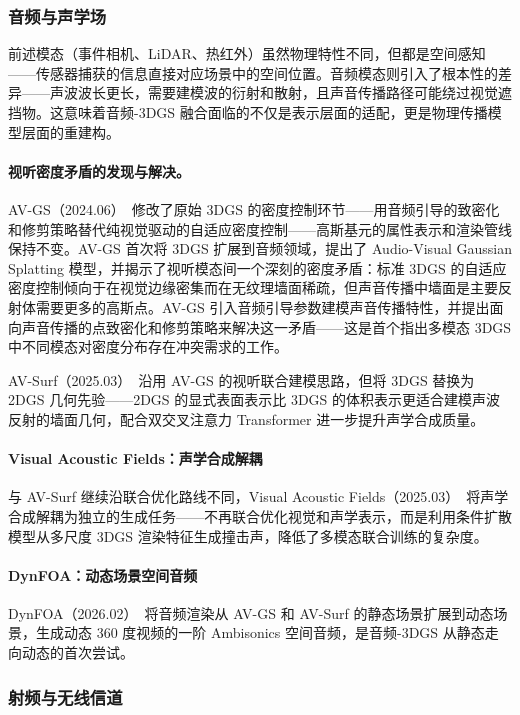 \subsubsection{音频与声学场}

前述模态（事件相机、LiDAR、热红外）虽然物理特性不同，但都是空间感知——传感器捕获的信息直接对应场景中的空间位置。音频模态则引入了根本性的差异——声波波长更长，需要建模波的衍射和散射，且声音传播路径可能绕过视觉遮挡物。这意味着音频-3DGS 融合面临的不仅是表示层面的适配，更是物理传播模型层面的重建构。

\paragraph{视听密度矛盾的发现与解决。} AV-GS（2024.06）~\cite{2406_08920}修改了原始 3DGS 的密度控制环节——用音频引导的致密化和修剪策略替代纯视觉驱动的自适应密度控制——高斯基元的属性表示和渲染管线保持不变。AV-GS 首次将 3DGS 扩展到音频领域，提出了 Audio-Visual Gaussian Splatting 模型，并揭示了视听模态间一个深刻的密度矛盾：标准 3DGS 的自适应密度控制倾向于在视觉边缘密集而在无纹理墙面稀疏，但声音传播中墙面是主要反射体需要更多的高斯点。AV-GS 引入音频引导参数建模声音传播特性，并提出面向声音传播的点致密化和修剪策略来解决这一矛盾——这是首个指出多模态 3DGS 中不同模态对密度分布存在冲突需求的工作。

AV-Surf（2025.03）~\cite{2503_12806}沿用 AV-GS 的视听联合建模思路，但将 3DGS 替换为 2DGS 几何先验——2DGS 的显式表面表示比 3DGS 的体积表示更适合建模声波反射的墙面几何，配合双交叉注意力 Transformer 进一步提升声学合成质量。

\paragraph{Visual Acoustic Fields：声学合成解耦}
与 AV-Surf 继续沿联合优化路线不同，Visual Acoustic Fields（2025.03）~\cite{2503_24270}将声学合成解耦为独立的生成任务——不再联合优化视觉和声学表示，而是利用条件扩散模型从多尺度 3DGS 渲染特征生成撞击声，降低了多模态联合训练的复杂度。

\paragraph{DynFOA：动态场景空间音频}
DynFOA（2026.02）~\cite{2602_06846}将音频渲染从 AV-GS 和 AV-Surf 的静态场景扩展到动态场景，生成动态 360 度视频的一阶 Ambisonics 空间音频，是音频-3DGS 从静态走向动态的首次尝试。

\subsubsection{射频与无线信道}


